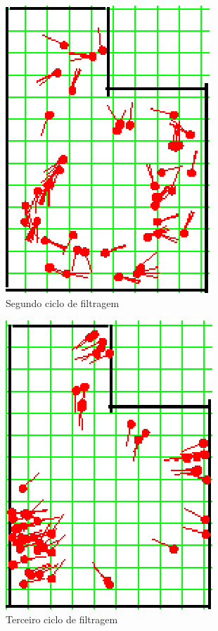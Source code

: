 \begin{figure}[H]
  \centering
  \includegraphics[scale=1]{figuras/cen1_ex3/3.eps}
  \caption[Segundo Ciclo de Filtragem]{Segundo ciclo de filtragem}
  \label{img:cen1_ex3_3}
\end{figure}

\begin{figure}[H]
  \centering
  \includegraphics[scale=1]{figuras/cen1_ex3/4.eps}
  \caption[Terceiro Ciclo de Filtragem]{Terceiro ciclo de filtragem}
  \label{img:cen1_ex3_4}
\end{figure}

